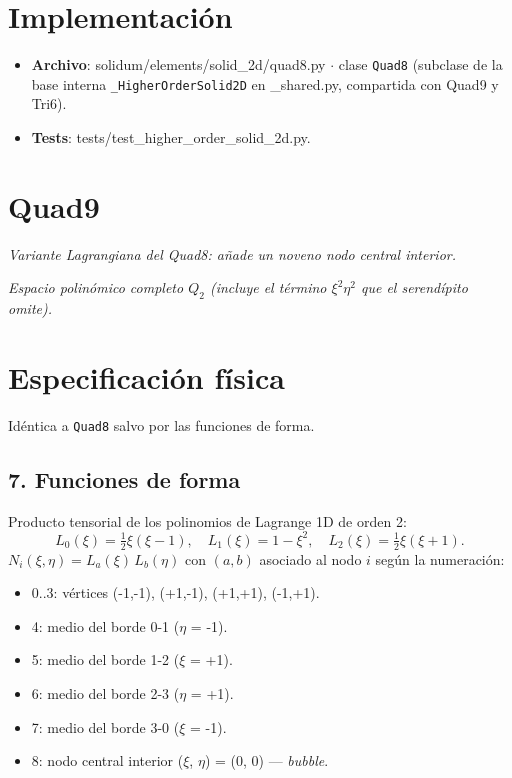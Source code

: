\documentclass[11pt,letterpaper,oneside]{report}
\begin{document}
\section{Implementación}

\begin{itemize}
  \item \textbf{Archivo}: solidum/elements/solid\_2d/quad8.py \ensuremath{\cdot} clase \texttt{Quad8} (subclase de la base interna \texttt{\_HigherOrderSolid2D} en \_shared.py, compartida con Quad9 y Tri6).
  \item \textbf{Tests}: tests/test\_higher\_order\_solid\_2d.py.
\end{itemize}


\newpage

\section{Quad9}



\textit{Variante Lagrangiana del Quad8: añade un noveno nodo central interior.}

\textit{Espacio polinómico completo $Q_2$ (incluye el término $\xi^2\eta^2$ que el serendípito omite).}



\section{Especificación física}

Idéntica a \texttt{Quad8} salvo por las funciones de forma.

\subsection{7. Funciones de forma}
Producto tensorial de los polinomios de Lagrange 1D de orden 2:
\[
L_0(\xi) = \tfrac{1}{2}\xi(\xi - 1), \quad L_1(\xi) = 1 - \xi^2, \quad L_2(\xi) = \tfrac{1}{2}\xi(\xi + 1).
\]
$N_i(\xi, \eta) = L_a(\xi)\,L_b(\eta)$ con $(a, b)$ asociado al nodo $i$ según la numeración:

\begin{itemize}
  \item 0..3: vértices (-1,-1), (+1,-1), (+1,+1), (-1,+1).
  \item 4: medio del borde 0-1 (\ensuremath{\eta} = -1).
  \item 5: medio del borde 1-2 (\ensuremath{\xi} = +1).
  \item 6: medio del borde 2-3 (\ensuremath{\eta} = +1).
  \item 7: medio del borde 3-0 (\ensuremath{\xi} = -1).
  \item 8: nodo central interior (\ensuremath{\xi}, \ensuremath{\eta}) = (0, 0) --- \textit{bubble}.
\end{itemize}
\end{document}
